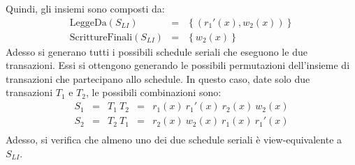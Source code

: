 \documentclass[a4paper]{article}
\begin{document}
	\noindent
	Quindi, gli insiemi sono composti da:
	\begin{equation*}
		\begin{array}{rll}
			\text{LeggeDa}\left(S_{LI}\right) &=& \left\{\left(r_{1}'\left(x\right), w_{2}\left(x\right)\right)\right\} \\
			\text{ScrittureFinali}\left(S_{LI}\right) &=& \left\{w_{2}\left(x\right)\right\}
		\end{array}
	\end{equation*}
	Adesso si generano tutti i possibili schedule seriali che eseguono le due transazioni. Essi si ottengono generando le possibili permutazioni dell'insieme di transazioni che partecipano allo schedule. In questo caso, date solo due transazioni $T_{1}$ e $T_{2}$, le possibili combinazioni sono:
	\begin{equation*}
		\begin{array}{lllll}
			S_{1} &=& T_{1} \: T_{2} &=& r_{1}\left(x\right) \: r_{1}'\left(x\right) \: r_{2}\left(x\right) \: w_{2}\left(x\right) \\
			S_{2} &=& T_{2} \: T_{1} &=& r_{2}\left(x\right) \: w_{2}\left(x\right) \: r_{1}\left(x\right) \: r_{1}'\left(x\right) \\
		\end{array}
	\end{equation*}
	Adesso, si verifica che almeno uno dei due schedule seriali è view-equivalente a $S_{LI}$.\newpage
	
\end{document}

